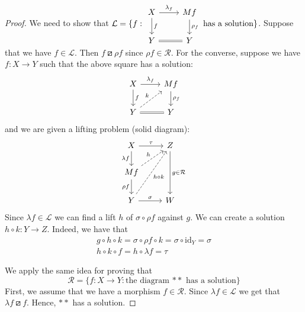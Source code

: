 \documentclass{article}
\theoremstyle{definition}
\newcommand{\comp}{\mathbin{\circ}}
\newcommand{\idarrow}[1][]{\mathrm{id}_{#1}}
\begin{document}
\begin{proof}
We need to show that
$\mathcal{L} = \{f : \begin{tikzcd}
                      X \ar[r,"\lambda_f"] \ar[d,"f"] & Mf \ar[d,"\rho_f"] \\
                      Y \ar[r,equal] & Y
                     \end{tikzcd}
 \text{ has a solution}\}$.
Suppose that we have $f \in \mathcal{L}$.
Then $f \boxslash \rho f$ since $\rho f \in \mathcal{R}$.
For the converse, suppose we have
$f :X \to Y$ such that the above square has a
solution:
\[
 \begin{tikzcd}
  X \ar[r,"\lambda_f"] \ar[d,"f"] & Mf \ar[d,"\rho_f"] \\
  Y \ar[r,equal] \ar[ur, dashed, "k"] & Y
\end{tikzcd}
\]
and we are given a lifting problem (solid diagram):
\[
 \begin{tikzcd}
  X \rar["\tau"] \dar["\lambda f"'] & Z \ar[dd, "g \in \mathcal{R}"] \\
  M f \dar["\rho f"'] \ar[ur, dashed, "h"] & \\
  Y \rar["\sigma"] \ar[uur, dashed, "h \comp k"'] & W
 \end{tikzcd}
\]
Since $\lambda f \in \mathcal{L}$
we can find a lift $h$ of $\sigma \comp \rho f$
against $g$. We can create a solution
$h \comp k : Y \to Z$. Indeed,
we have that
\begin{align*}
 g \comp h \comp k = \sigma \comp \rho f \comp k = \sigma \comp \idarrow[Y] = \sigma \\
 h \comp k \comp f = h \comp \lambda f = \tau
\end{align*}

We apply the same idea for proving
that
\[
 \mathcal{R} = \{f: X \to Y : \text{the diagram $**$ has a solution}\}
\]
First, we assume that we have a morphism
$f \in \mathcal{R}$. Since $\lambda f \in \mathcal{L}$
we get that $\lambda f \boxslash f$. Hence,
$**$ has a solution.


\end{proof}
\end{document}

